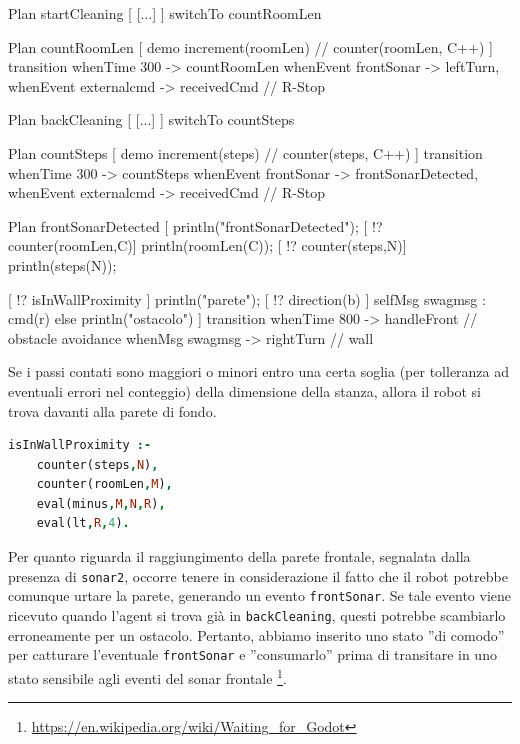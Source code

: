 \documentclass{../llncs}
\newcommand{\codescript}[1]{{\mbox{\small{\texttt{#1}}}}\xspace}
\newcommand{\code}[1]{{\color{blue}\small{\texttt{#1}}}}
\begin{document}
\begin{qacode}[caption={SoftwareAgent, pt11}]
Plan startCleaning [
	[...]
]
switchTo countRoomLen

Plan countRoomLen [
	demo increment(roomLen) // counter(roomLen, C++)
]
transition
	whenTime 300 -> countRoomLen
	whenEvent frontSonar -> leftTurn,
	whenEvent externalcmd -> receivedCmd // R-Stop
	
Plan backCleaning [
	[...]
]
switchTo countSteps

Plan countSteps [
	demo increment(steps) // counter(steps, C++)
]
transition
	whenTime 300 -> countSteps
	whenEvent frontSonar -> frontSonarDetected,
	whenEvent externalcmd -> receivedCmd // R-Stop
	
Plan frontSonarDetected [
	println("frontSonarDetected");
	[ !? counter(roomLen,C)] println(roomLen(C));
	[ !? counter(steps,N)] println(steps(N));
	
	[ !? isInWallProximity ] {
		println("parete");
		[ !? direction(b) ] selfMsg swagmsg : cmd(r)
	}
	else
		println("ostacolo")
]
transition
	whenTime 800 -> handleFront // obstacle avoidance
	whenMsg swagmsg -> rightTurn // wall
\end{qacode}

Se i passi contati sono maggiori o minori entro una certa soglia (per tolleranza ad eventuali errori nel conteggio) della dimensione della stanza, allora il robot si trova davanti alla parete di fondo.\\

\begin{lstlisting}[language=Prolog, keywordstyle=\color{black}, caption={SoftwareAgent, Rules - pt4}]
isInWallProximity :-
	counter(steps,N),
	counter(roomLen,M),
	eval(minus,M,N,R),
	eval(lt,R,4).
\end{lstlisting}

Per quanto riguarda il raggiungimento della parete frontale, segnalata dalla presenza di \code{sonar2}, occorre tenere in considerazione il fatto che il robot potrebbe comunque urtare la parete, generando un evento \codescript{frontSonar}. Se tale evento viene ricevuto quando l'agent si trova già in \codescript{backCleaning}, questi potrebbe scambiarlo erroneamente per un ostacolo. Pertanto, abbiamo inserito uno stato ''di comodo'' per catturare l'eventuale \codescript{frontSonar} e ''consumarlo'' prima di transitare in uno stato sensibile agli eventi del sonar frontale
\footnote{
\url{https://en.wikipedia.org/wiki/Waiting_for_Godot}
}.\\
\end{document}
